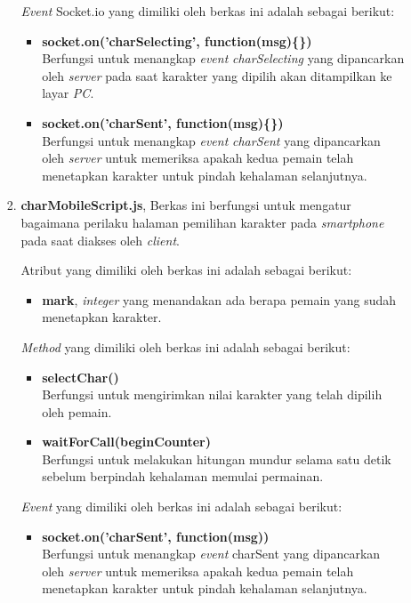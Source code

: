 \begin{enumerate}
\begin{enumerate}
\begin{enumerate}
			\textit{Event} Socket.io yang dimiliki oleh berkas ini adalah sebagai berikut:
			\begin{itemize}
				\item \textbf{socket.on('charSelecting', function(msg)\{\})} \\
				Berfungsi untuk menangkap \textit{event} \textit{charSelecting} yang dipancarkan oleh \textit{server} pada saat karakter yang dipilih akan ditampilkan ke layar \textit{PC}.
				
				\item \textbf{socket.on('charSent', function(msg)\{\})} \\
				Berfungsi untuk menangkap \textit{event} \textit{charSent} yang dipancarkan oleh \textit{server} untuk memeriksa apakah kedua pemain telah menetapkan karakter untuk pindah kehalaman selanjutnya.
			\end{itemize}
			
			\item \textbf{charMobileScript.js}, Berkas ini berfungsi untuk mengatur bagaimana perilaku halaman pemilihan karakter pada \textit{smartphone} pada saat diakses oleh \textit{client}.
			
			Atribut yang dimiliki oleh berkas ini adalah sebagai berikut:
			\begin{itemize}
				\item \textbf{mark}, \textit{integer} yang menandakan ada berapa pemain yang sudah menetapkan karakter.
			\end{itemize}
		
			\textit{Method} yang dimiliki oleh berkas ini adalah sebagai berikut:
			\begin{itemize}
				\item \textbf{selectChar()} \\
				Berfungsi untuk mengirimkan nilai karakter yang telah dipilih oleh pemain.
				
				\item \textbf{waitForCall(beginCounter)} \\ Berfungsi untuk melakukan hitungan mundur selama satu detik sebelum berpindah kehalaman memulai permainan.
			\end{itemize}
			
			\textit{Event} yang dimiliki oleh berkas ini adalah sebagai berikut:
			\begin{itemize}
				\item \textbf{socket.on('charSent', function(msg){})} \\ 
				Berfungsi untuk menangkap \textit{event} charSent yang dipancarkan oleh \textit{server} untuk memeriksa apakah kedua pemain telah menetapkan karakter untuk pindah kehalaman selanjutnya.
				

\end{itemize}
\end{enumerate}
\end{enumerate}
\end{enumerate}
